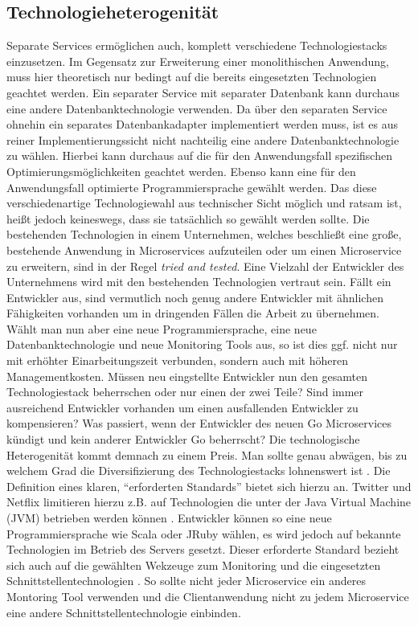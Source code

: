 \subsection{Technologieheterogenität}
Separate Services ermöglichen auch, komplett verschiedene Technologiestacks einzusetzen. Im Gegensatz zur Erweiterung einer monolithischen Anwendung, muss hier theoretisch nur bedingt auf die bereits eingesetzten Technologien geachtet werden. Ein separater Service mit separater Datenbank kann durchaus eine andere Datenbanktechnologie verwenden. Da über den separaten Service ohnehin ein separates Datenbankadapter implementiert werden muss, ist es aus reiner Implementierungssicht nicht nachteilig eine andere Datenbanktechnologie zu wählen. Hierbei kann durchaus auf die für den Anwendungsfall spezifischen Optimierungsmöglichkeiten geachtet werden. Ebenso kann eine für den Anwendungsfall optimierte Programmiersprache gewählt werden.
Das diese verschiedenartige Technologiewahl aus technischer Sicht möglich und ratsam ist, heißt jedoch keineswegs, dass sie tatsächlich so gewählt werden sollte. Die bestehenden Technologien in einem Unternehmen, welches beschließt eine große, bestehende Anwendung in Microservices aufzuteilen oder um einen Microservice zu erweitern, sind in der Regel \textit{tried and tested}. Eine Vielzahl der Entwickler des Unternehmens wird mit den bestehenden Technologien vertraut sein. Fällt ein Entwickler aus, sind vermutlich noch genug andere Entwickler mit ähnlichen Fähigkeiten vorhanden um in dringenden Fällen die Arbeit zu übernehmen. Wählt man nun aber eine neue Programmiersprache, eine neue Datenbanktechnologie und neue Monitoring Tools aus, so ist dies ggf. nicht nur mit erhöhter Einarbeitungszeit verbunden, sondern auch mit höheren Managementkosten. Müssen neu eingstellte Entwickler nun den gesamten Technologiestack beherrschen oder nur einen der zwei Teile? Sind immer ausreichend Entwickler vorhanden um einen ausfallenden Entwickler zu kompensieren? Was passiert, wenn der Entwickler des neuen Go Microservices kündigt und kein anderer Entwickler Go beherrscht? Die technologische Heterogenität kommt demnach zu einem Preis. Man sollte genau abwägen, bis zu welchem Grad die Diversifizierung des Technologiestacks lohnenswert ist \cite[vgl.][Seiten 5, 6]{newman2015building}.
Die Definition eines klaren, ``erforderten Standards'' \cite[vgl.][Seiten 20, 21]{newman2015building} bietet sich hierzu an. Twitter und Netflix limitieren hierzu z.B. auf Technologien die unter der Java Virtual Machine (JVM) betrieben werden können \cite[][Seite 6]{newman2015building}. Entwickler können so eine neue Programmiersprache wie Scala oder JRuby wählen, es wird jedoch auf bekannte Technologien im Betrieb des Servers gesetzt. Dieser erforderte Standard bezieht sich auch auf die gewählten Wekzeuge zum Monitoring und die eingesetzten Schnittstellentechnologien \cite[vgl.][Seite 21]{newman2015building}. So sollte nicht jeder Microservice ein anderes Montoring Tool verwenden und die Clientanwendung nicht zu jedem Microservice eine andere Schnittstellentechnologie einbinden.

